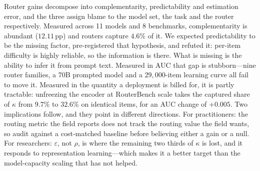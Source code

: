 \documentclass[10pt]{article}
\newcommand{\pp}{\,\text{pp}}
\begin{document}
Router gains decompose into complementarity, predictability and estimation
error, and the three assign blame to the model set, the task and the router
respectively. Measured across 11 models and 8 benchmarks, complementarity is
abundant ($12.11\pp$) and routers capture $4.6\%$ of it. We expected
predictability to be the missing factor, pre-registered that hypothesis, and
refuted it: per-item difficulty is highly reliable, so the information is there.
What is missing is the ability to infer it from prompt text. Measured in AUC that
gap is stubborn---nine router families, a 70B prompted model and a
$29{,}000$-item learning curve all fail to move it. Measured in the quantity a
deployment is billed for, it is partly tractable: unfreezing the encoder at
RouterBench scale takes the captured share of $\kappa$ from $9.7\%$ to $32.6\%$
on identical items, for an AUC change of $+0.005$. Two implications follow, and
they point in different directions. For practitioners: the routing metric the
field reports does not track the routing value the field wants, so audit against
a cost-matched baseline before believing either a gain or a null. For
researchers: $\varepsilon$, not $\rho$, is where the remaining two thirds of
$\kappa$ is lost, and it responds to representation learning---which makes it a
better target than the model-capacity scaling that has not helped.
\end{document}
